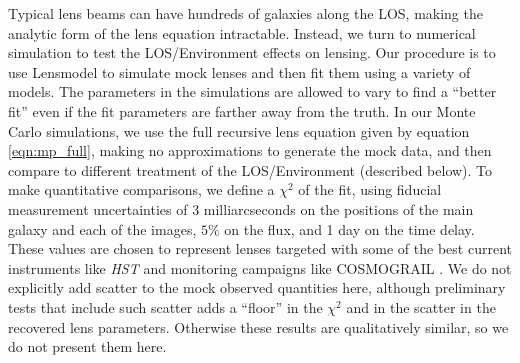 Typical lens beams can have hundreds of galaxies along the LOS, making the analytic form of the lens equation intractable. Instead, we turn to numerical simulation to test the LOS/Environment effects on lensing. Our procedure is to use Lensmodel \citep{Keeton01} to simulate mock lenses and then fit them using a variety of models. The parameters in the simulations are allowed to vary to find a ``better fit'' even if the fit parameters are farther away from the truth. In our Monte Carlo simulations, we use the full recursive lens equation given by equation \ref{eqn:mp_full}, making no approximations to generate the mock data, and then compare to different treatment of the LOS/Environment (described below). To make quantitative comparisons, we define a $\chi^2$ of the fit, using fiducial measurement uncertainties of 3 milliarcseconds on the positions of the main galaxy and each of the images, $5\%$ on the flux, and 1 day on the time delay. These values are chosen to represent lenses targeted with some of the best current instruments like \textit{HST} and monitoring campaigns like COSMOGRAIL \citep{Eigenbrod05}. We do not explicitly add scatter to the mock observed quantities here, although preliminary tests that include such scatter adds a ``floor'' in the $\chi^2$ and in the scatter in the recovered lens parameters. Otherwise these results are qualitatively similar, so we do not present them here.